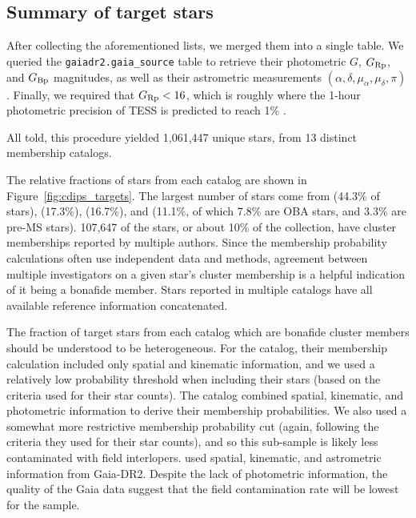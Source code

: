 \documentclass[12pt,twocolumn,tighten]{aastex62}
\begin{document}
\subsection{Summary of target stars}
\label{subsec:ocmgsummary}


After collecting the aforementioned lists, we merged them into a
single table. We queried the \texttt{gaiadr2.gaia\_source} table to
retrieve their photometric $G$, $G_{\rm Rp}$, and $G_{\rm Bp}$
magnitudes, as well as their astrometric measurements $(\alpha,
\delta, \mu_\alpha, \mu_\delta, \pi)$.  Finally, we required that
$G_{\rm Rp} < 16$, which is roughly where the 1-hour photometric
precision of TESS is predicted to reach 1\%
\citep{ricker_transiting_2015}.

All told, this procedure yielded 1{,}061{,}447 unique stars, from 13
distinct membership catalogs.

The relative fractions of stars from each catalog are shown in
Figure~\ref{fig:cdips_targets}.
The largest number of stars come from \citealt{dias_proper_2014}
(44.3\% of stars), \citealt{Kharchenko_et_al_2013} (17.3\%),
\citealt{cantat-gaudin_gaia_2018} (16.7\%), and \citealt{zari_3d_2018}
(11.1\%, of which 7.8\% are OBA stars, and 3.3\% are pre-MS stars).
107{,}647 of the stars, or about 10\%
of the collection, have cluster memberships reported by multiple
authors.  Since the membership probability calculations often use
independent data and methods, agreement between multiple investigators
on a given star's cluster membership is a helpful indication of it
being a bonafide member.
Stars reported in multiple catalogs have all available reference information
concatenated.  

The fraction of target stars from each catalog which are bonafide
cluster members should be understood to be heterogeneous.  For the
\citet{dias_proper_2014} catalog, their membership calculation
included only spatial and kinematic information, and we used a
relatively low probability threshold when including their stars (based
on the criteria \citealt{dias_proper_2014} used for their star
counts).  The \citet{Kharchenko_et_al_2013} catalog combined spatial,
kinematic, and photometric information to derive their membership
probabilities.  We also used a somewhat more restrictive membership
probability cut (again, following the criteria they used for their
star counts), and so this sub-sample is likely less contaminated
with field interlopers.
\citet{cantat-gaudin_gaia_2018} used spatial, kinematic, and
astrometric information from Gaia-DR2. Despite the lack of
photometric information, the quality of the Gaia data suggest that the
field contamination rate will be lowest for the
\citet{cantat-gaudin_gaia_2018} sample.
\end{document}
